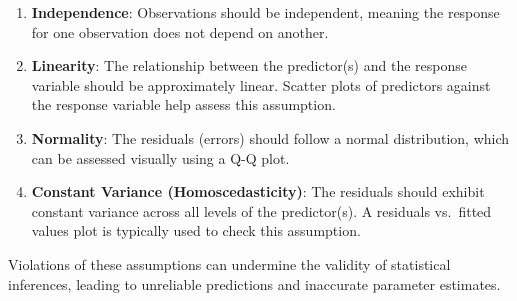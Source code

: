 \documentclass[
  11pt,
]{book}
\providecommand{\tightlist}{%
  \setlength{\itemsep}{0pt}\setlength{\parskip}{0pt}}
\theoremstyle{definition}
\theoremstyle{definition}
\theoremstyle{definition}
\theoremstyle{definition}
\theoremstyle{remark}
\begin{document}
\begin{enumerate}
\def\labelenumi{\arabic{enumi}.}
\tightlist
\item
  \textbf{Independence}: Observations should be independent, meaning the response for one observation does not depend on another.\\
\item
  \textbf{Linearity}: The relationship between the predictor(s) and the response variable should be approximately linear. Scatter plots of predictors against the response variable help assess this assumption.\\
\item
  \textbf{Normality}: The residuals (errors) should follow a normal distribution, which can be assessed visually using a Q-Q plot.\\
\item
  \textbf{Constant Variance (Homoscedasticity)}: The residuals should exhibit constant variance across all levels of the predictor(s). A residuals vs.~fitted values plot is typically used to check this assumption.
\end{enumerate}

Violations of these assumptions can undermine the validity of statistical inferences, leading to unreliable predictions and inaccurate parameter estimates.
\end{document}

